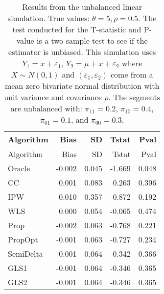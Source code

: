 \documentclass[
  letterpaper,
  DIV=11,
  numbers=noendperiod]{scrartcl}
\begin{document}
\begin{longtable}[]{@{}lrrrr@{}}
\caption{Results from the unbalanced linear simulation. True values:
\(\theta = 5, \rho = 0.5\). The test conducted for the T-statistic and
P-value is a two sample test to see if the estimator is unbiased. This
simulation uses \(Y_1 = x + \varepsilon_1\),
\(Y_2 = \mu + x + \varepsilon_2\) where \(X \sim N(0, 1)\) and
\((\varepsilon_1, \varepsilon_2)\) come from a mean zero bivariate
normal distribution with unit variance and covariance \(\rho\). The
segments are unbalanced with: \(\pi_{11} = 0.2\), \(\pi_{10} = 0.4\),
\(\pi_{01} = 0.1\), and \(\pi_{00} = 0.3\). }\tabularnewline
\toprule\noalign{}
Algorithm & Bias & SD & Tstat & Pval \\
\midrule\noalign{}
\endfirsthead
\toprule\noalign{}
Algorithm & Bias & SD & Tstat & Pval \\
\midrule\noalign{}
\endhead
\bottomrule\noalign{}
\endlastfoot
Oracle & -0.002 & 0.045 & -1.669 & 0.048 \\
CC & 0.001 & 0.083 & 0.263 & 0.396 \\
IPW & 0.010 & 0.357 & 0.872 & 0.192 \\
WLS & 0.000 & 0.054 & -0.065 & 0.474 \\
Prop & -0.002 & 0.063 & -0.768 & 0.221 \\
PropOpt & -0.001 & 0.063 & -0.727 & 0.234 \\
SemiDelta & -0.001 & 0.064 & -0.342 & 0.366 \\
GLS1 & -0.001 & 0.064 & -0.346 & 0.365 \\
GLS2 & -0.001 & 0.064 & -0.346 & 0.365 \\
\end{longtable}
\end{document}
